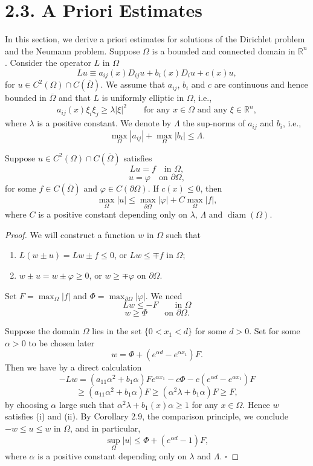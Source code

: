 \section*{2.3. A Priori Estimates}

In this section, we derive a priori estimates for solutions of the Dirichlet problem
and the Neumann problem.
Suppose $\Omega$ is a bounded and connected domain in $\mathbb{R}^n$. Consider the operator
$L$ in $\Omega$
\[
Lu \equiv a_{ij}(x)D_{ij}u + b_i(x)D_iu + c(x)u,
\]
for $u \in C^2(\Omega)\cap C(\overline{\Omega})$. We assume that $a_{ij}$, $b_i$ and $c$ are continuous and hence
bounded in $\overline{\Omega}$ and that $L$ is uniformly elliptic in $\Omega$, i.e.,
\[
a_{ij}(x)\xi_i\xi_j \ge \lambda |\xi|^2 \qquad \text{for any } x\in \Omega \text{ and any } \xi \in \mathbb{R}^n,
\]
where $\lambda$ is a positive constant. We denote by $\Lambda$ the sup-norms of $a_{ij}$ and $b_i$, i.e.,
\[
\max_{\Omega}|a_{ij}| + \max_{\Omega}|b_i| \le \Lambda.
\]

\begin{theorem}\label{hanlin:maxprin-theorem-2-24}
Suppose $u \in C^2(\Omega)\cap C(\overline{\Omega})$ satisfies
\[
Lu = f \quad \text{in } \Omega,
\]
\[
u = \varphi \quad \text{on } \partial\Omega,
\]
for some $f \in C(\overline{\Omega})$ and $\varphi \in C(\partial\Omega)$. If $c(x)\le 0$, then
\[
\max_{\Omega}|u| \le \max_{\partial\Omega}|\varphi| + C\max_{\Omega}|f|,
\]
where $C$ is a positive constant depending only on $\lambda$, $\Lambda$ and $\operatorname{diam}(\Omega)$.
\end{theorem}

\begin{proof}
\sketch
We will construct a function $w$ in $\Omega$ such that
\begin{enumerate}
\item[(i)] $L(w\pm u)=Lw\pm f\le 0$, or $Lw\le \mp f$ in $\Omega$;
\item[(ii)] $w\pm u=w\pm \varphi \ge 0$, or $w\ge \mp\varphi$ on $\partial\Omega$.
\end{enumerate}
Set $F=\max_{\Omega}|f|$ and $\Phi=\max_{\partial\Omega}|\varphi|$. We need
\[
Lw \le -F \qquad \text{in } \Omega
\]
\[
w \ge \Phi \qquad \text{on } \partial\Omega.
\]

Suppose the domain $\Omega$ lies in the set $\{0<x_1<d\}$ for some $d>0$. Set for some
$\alpha>0$ to be chosen later
\[
w=\Phi + (e^{\alpha d}-e^{\alpha x_1})F.
\]
Then we have by a direct calculation
\[
-Lw=(a_{11}\alpha^2+b_1\alpha)Fe^{\alpha x_1}-c\Phi-c(e^{\alpha d}-e^{\alpha x_1})F
\]
\[
\ge (a_{11}\alpha^2+b_1\alpha)F \ge (\alpha^2\lambda+b_1\alpha)F \ge F,
\]
by choosing $\alpha$ large such that $\alpha^2\lambda+b_1(x)\alpha\ge 1$ for any $x\in\Omega$. Hence $w$ satisfies
(i) and (ii). By Corollary 2.9, the comparison principle, we conclude $-w\le u\le w$
in $\Omega$, and in particular,
\[
\sup_{\Omega}|u| \le \Phi + (e^{\alpha d}-1)F,
\]
where $\alpha$ is a positive constant depending only on $\lambda$ and $\Lambda$.
\hfill$\square$
\end{proof}

